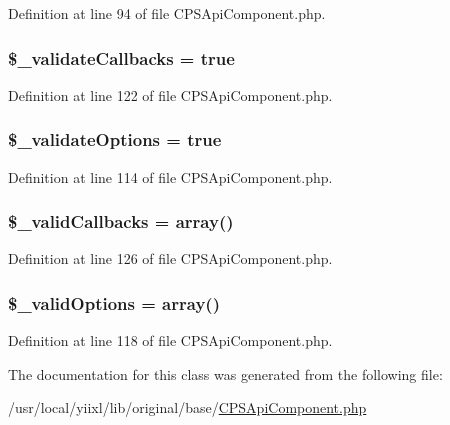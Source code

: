 Definition at line 94 of file CPSApiComponent.php.

\hypertarget{classCPSApiComponent_a73fdad41769f4f4ef1ebeaba5380ffad}{
\subsubsection[{\$\_\-validateCallbacks}]{\setlength{\rightskip}{0pt plus 5cm}\$\_\-validateCallbacks = true}}
\label{classCPSApiComponent_a73fdad41769f4f4ef1ebeaba5380ffad}


Definition at line 122 of file CPSApiComponent.php.

\hypertarget{classCPSApiComponent_a06b741ce121a93d6010e3c514edba22b}{
\subsubsection[{\$\_\-validateOptions}]{\setlength{\rightskip}{0pt plus 5cm}\$\_\-validateOptions = true}}
\label{classCPSApiComponent_a06b741ce121a93d6010e3c514edba22b}


Definition at line 114 of file CPSApiComponent.php.

\hypertarget{classCPSApiComponent_aadd5e6fdc7ba1ec3b3e4a916c4f005d0}{
\subsubsection[{\$\_\-validCallbacks}]{\setlength{\rightskip}{0pt plus 5cm}\$\_\-validCallbacks = {\bf array}()}}
\label{classCPSApiComponent_aadd5e6fdc7ba1ec3b3e4a916c4f005d0}


Definition at line 126 of file CPSApiComponent.php.

\hypertarget{classCPSApiComponent_afe1adfd2c4c57954ea5230cae01d1c47}{
\subsubsection[{\$\_\-validOptions}]{\setlength{\rightskip}{0pt plus 5cm}\$\_\-validOptions = {\bf array}()}}
\label{classCPSApiComponent_afe1adfd2c4c57954ea5230cae01d1c47}


Definition at line 118 of file CPSApiComponent.php.



The documentation for this class was generated from the following file:\begin{DoxyCompactItemize}
\item 
/usr/local/yiixl/lib/original/base/\hyperlink{CPSApiComponent_8php}{CPSApiComponent.php}\end{DoxyCompactItemize}
